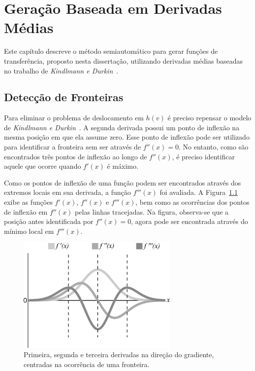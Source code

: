
\chapter{Geração Baseada em Derivadas Médias}
\label{ch:my}
	Este capítulo descreve o método semiautomático para gerar funções de transferência, proposto nesta dissertação, utilizando derivadas médias baseadas no trabalho de \textit{Kindlmann e Durkin}~\cite{gordon}.

\section{Detecção de Fronteiras}
\label{sec:my.deriv}
	Para eliminar o problema de deslocamento em $ h(v) $ é preciso repensar o modelo de \textit{Kindlmann e Durkin}~\cite{gordon}. A segunda derivada possui um ponto de inflexão na mesma posição em que ela assume zero. Esse ponto de inflexão pode ser utilizado para identificar a fronteira sem ser através de $ f''(x) = 0 $. No entanto, como são encontrados três pontos de inflexão ao longo de $ f''(x) $, é preciso identificar aquele que ocorre quando $ f'(x) $ é máximo.
	
	Como os pontos de inflexão de uma função podem ser encontrados através dos extremos locais em sua derivada, a função $ f'''(x) $ foi avaliada. A Figura~\ref{fig:m_inflection} exibe as funções $ f'(x) $, $ f''(x) $ e $ f'''(x) $, bem como as ocorrências dos pontos de inflexão em $ f''(x) $ pelas linhas tracejadas. Na figura, observa-se que a posição antes identificada por $ f''(x) = 0 $, agora pode ser encontrada através do mínimo local em $ f'''(x) $. 
	
\begin{figure}[h]
	\centering
	\includegraphics[width=0.7\textwidth]{images/m_inflection}
	\caption{Primeira, segunda e terceira derivadas na direção do gradiente, centradas na ocorrência de uma fronteira.}
	\label{fig:m_inflection}
\end{figure}

